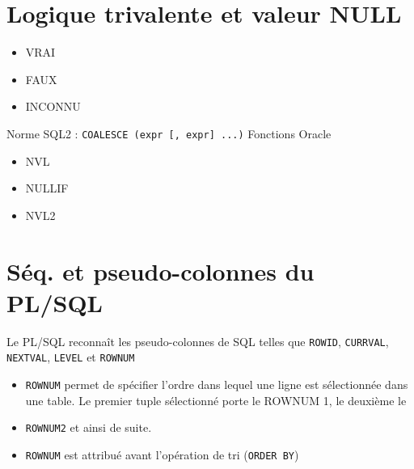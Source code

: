 \documentclass[10pt]{beamer}
\begin{document}
\section{Logique trivalente et valeur NULL}
\begin{frame}{\secname}
    \begin{itemize}
        \item VRAI
        \item FAUX
        \item INCONNU
    \end{itemize}
\end{frame}

\begin{frame}{\secname}
    Norme SQL2 : \lstinline[language=bnf]!COALESCE (expr [, expr] ...)!
    Fonctions Oracle
    \begin{itemize}
        \item NVL
        \item NULLIF
        \item NVL2
    \end{itemize}
\end{frame}
\section{Séq. et pseudo-colonnes du PL/SQL}
\begin{frame}{\secname}
    Le PL/SQL reconnaît les pseudo-colonnes de SQL telles que \lstinline[language=xml]!ROWID!, \lstinline[language=xml]!CURRVAL!, \lstinline[language=xml]!NEXTVAL!, \lstinline[language=xml]!LEVEL! et \lstinline[language=xml]!ROWNUM!
    
\end{frame}

\begin{frame}{\secname}
    
\end{frame}

\begin{frame}{\secname}
    \begin{itemize}
        \item \lstinline[language=xml]!ROWNUM! permet de spécifier l'ordre dans lequel une ligne est sélectionnée dans une table.  Le premier tuple sélectionné porte le ROWNUM 1, le deuxième le
        \item \lstinline[language=xml]!ROWNUM2! et ainsi de suite.
        \item \lstinline[language=xml]!ROWNUM! est attribué avant l'opération de tri (\lstinline[language=xml]!ORDER BY!)
    \end{itemize}
\end{frame}

\begin{frame}{\secname}
    
\end{frame}

\begin{frame}{\secname}
    
\end{frame}
\end{document}
